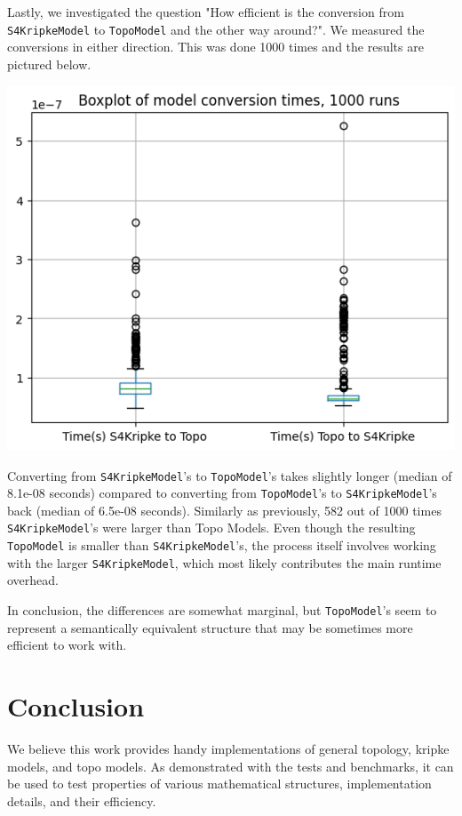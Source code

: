 \documentclass[12pt,a4paper]{article}
\begin{document}
Lastly, we investigated the question "How efficient is the conversion from \verb|S4KripkeModel| to \verb|TopoModel|
and the other way around?". We measured the conversions in either direction.
This was done 1000 times and the results are pictured below.

\begin{center}
\includegraphics*[width=0.5\linewidth]{bench-model-conversion.png}
\end{center}

Converting from \verb|S4KripkeModel|'s to \verb|TopoModel|'s takes slightly longer (median of 8.1e-08 seconds)
compared to converting from \verb|TopoModel|'s to \verb|S4KripkeModel|'s back (median of 6.5e-08 seconds).
Similarly as previously, 582 out of 1000 times \verb|S4KripkeModel|'s were larger than Topo Models.
Even though the resulting \verb|TopoModel| is smaller than \verb|S4KripkeModel|'s, the process itself involves
working with the larger \verb|S4KripkeModel|, which most likely contributes the main runtime overhead.

In conclusion, the differences are somewhat marginal, but \verb|TopoModel|'s seem to represent a semantically
equivalent structure that may be sometimes more efficient to work with.

\section{Conclusion}
We believe this work provides handy implementations of general topology, kripke models, and topo models. As demonstrated
with the tests and benchmarks, it can be used to test properties of various mathematical structures, implementation details,
and their efficiency.



\end{document}
